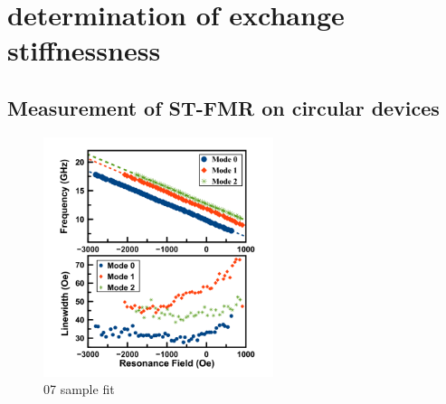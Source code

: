 \chapter{determination of exchange stiffnessness}



\section{Measurement of ST-FMR on circular devices}


\begin{figure}[!ht]
\centering
{}
\caption{}
\end{figure}




\begin{figure}[!ht]
  \centering
  \includegraphics[width=0.6\textwidth]{fig/2018/C07fit}
   \caption{07 sample fit}
  \label{fig:07fit}
\end{figure}





